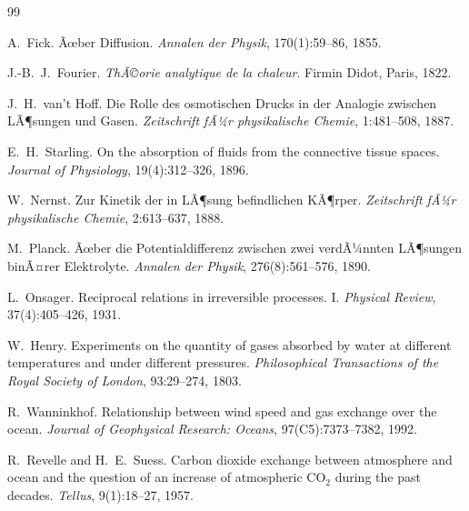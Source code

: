 ﻿\documentclass[a4paper,12pt]{article}
\theoremstyle{definition}
\begin{document}
\begin{thebibliography}{99}

A.\ Fick.
\newblock Ãœber Diffusion.
\newblock \textit{Annalen der Physik}, 170(1):59--86, 1855.

J.-B.\ J.\ Fourier.
\newblock \textit{ThÃ©orie analytique de la chaleur}.
\newblock Firmin Didot, Paris, 1822.

J.\ H.\ van't Hoff.
\newblock Die Rolle des osmotischen Drucks in der Analogie zwischen LÃ¶sungen und Gasen.
\newblock \textit{Zeitschrift fÃ¼r physikalische Chemie}, 1:481--508, 1887.

E.\ H.\ Starling.
\newblock On the absorption of fluids from the connective tissue spaces.
\newblock \textit{Journal of Physiology}, 19(4):312--326, 1896.

W.\ Nernst.
\newblock Zur Kinetik der in LÃ¶sung befindlichen KÃ¶rper.
\newblock \textit{Zeitschrift fÃ¼r physikalische Chemie}, 2:613--637, 1888.

M.\ Planck.
\newblock Ãœber die Potentialdifferenz zwischen zwei verdÃ¼nnten LÃ¶sungen
         binÃ¤rer Elektrolyte.
\newblock \textit{Annalen der Physik}, 276(8):561--576, 1890.

L.\ Onsager.
\newblock Reciprocal relations in irreversible processes. I.
\newblock \textit{Physical Review}, 37(4):405--426, 1931.

W.\ Henry.
\newblock Experiments on the quantity of gases absorbed by water at different
         temperatures and under different pressures.
\newblock \textit{Philosophical Transactions of the Royal Society of London},
         93:29--274, 1803.

R.\ Wanninkhof.
\newblock Relationship between wind speed and gas exchange over the ocean.
\newblock \textit{Journal of Geophysical Research: Oceans},
         97(C5):7373--7382, 1992.

R.\ Revelle and H.\ E.\ Suess.
\newblock Carbon dioxide exchange between atmosphere and ocean and the question
         of an increase of atmospheric CO$_2$ during the past decades.
\newblock \textit{Tellus}, 9(1):18--27, 1957.


\end{thebibliography}
\end{document}
